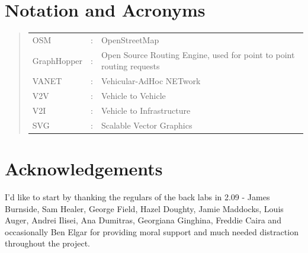 \documentclass[ %
                    author={Alexander Hill},
                supervisor={Dr. Benjamin Sach},
                    degree={MEng},
                     title={MARMOSET},
                  subtitle={Multi-Agent Route Management using Online Simulation for Efficient Transportation},
                      type={research},
                      year={2016} ]{dissertation}
\begin{document}
\chapter*{Notation and Acronyms}




\begin{quote}
\noindent
\begin{tabular}{lcl}
OSM                 &:     & OpenStreetMap \\
GraphHopper         &:     & Open Source Routing Engine, used for point to point routing requests \\
VANET               &:     & Vehicular-AdHoc NETwork \\
V2V                 &:     & Vehicle to Vehicle \\
V2I                 &:     & Vehicle to Infrastructure \\
SVG                 &:     & Scalable Vector Graphics \\
\end{tabular}
\end{quote}


\chapter*{Acknowledgements}

I'd like to start by thanking the regulars of the back labs in 2.09 - James
Burnside, Sam Healer, George Field, Hazel Doughty, Jamie Maddocks, Louis Auger,
Andrei Ilisei, Ana Dumitras, Georgiana Ginghina, Freddie Caira and occasionally
Ben Elgar for providing moral support and much needed distraction throughout the
project.
\end{document}
